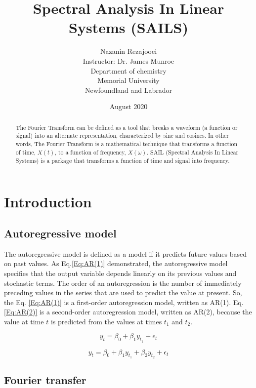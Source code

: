 \documentclass[12pt]{article}
\title {\textbf{Spectral Analysis In Linear Systems (SAILS)} \vspace{2 cm}}
\author{\huge \vspace{1.5 cm} Nazanin Rezajooei \\ \vspace{1 cm} Instructor: Dr. James Munroe \vspace{3 cm}\\  Department of chemistry \\ Memorial University \\ Newfoundland and Labrador}
\date{August 2020}
\begin{document}
\maketitle

\newpage
\begin{abstract}
 The Fourier Transform can be defined as a tool that breaks a waveform (a function or signal) into an alternate representation, characterized by sine and cosines. In other words, The Fourier Transform is a mathematical technique that transforms a function of time, $X(t)$, to a function of frequency, $X(\omega)$. SAIL (Spectral Analysis In Linear Systems) is a package that transforms a function of time and signal into frequency. 
\end{abstract}


\section{Introduction}
\subsection{Autoregressive model}

The autoregressive model is defined as a model if it predicts future values based on past values.
As Eq.\ref{Eq:AR(1)} demonstrated,  the autoregressive model specifies that the output variable depends linearly on its previous values and stochastic terms. The order of an autoregression is the number of immediately preceding values in the series that are used to predict the value at present. So, the Eq. \ref{Eq:AR(1)} is a first-order autoregression model, written as AR(1). Eq.\ref{Eq:AR(2)} is a second-order autoregression model, written as AR(2), because the value at time $t$ is predicted from the values at times $t_1$ and $t_2$.

\begin{equation}
    y_t = \beta_0 + \beta_1 y_{t_1} + \epsilon_t
    \label{Eq:AR(1)}
\end{equation}

\begin{equation}
    y_t = \beta_0 + \beta_1 y_{t_1} + \beta_2 y_{t_2} + \epsilon_t
    \label{Eq:AR(2)}
\end{equation}

\subsection{Fourier transfer}
\end{document}
